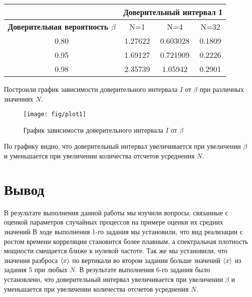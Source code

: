 \documentclass[a4paper,14pt]{extarticle}
\begin{document}
\begin{table}[htbp]
	\centering
	\begin{tabular}{|c|c|c|c|}
		\toprule
		\multicolumn{1}{|c|}{} & \multicolumn{3}{c|}{Доверительный интервал I} \\
		\midrule
		\textbf{Доверительная вероятность $\beta$} & N=1 & N=4 & N=32 \\
		\midrule
		0.80  & 1.27622 & 0.603028 & 0.1809 \\
		\midrule
		0.95  & 1.69127 & 0.721909 & 0.2226 \\
		\midrule
		0.98  & 2.35739 & 1.05942  & 0.2901 \\
		\bottomrule
	\end{tabular}%
\end{table}%
Построили график зависимости доверительного интервала $I$ от $\beta$ при различных значениях $N$.
 \begin{figure}[H]
	\centering
    \texttt{[image: fig/plot1]}
	\caption*{График зависимости доверительного интервала $I$ от $\beta$}
\end{figure}
По графику видно, что доверительный интервал увеличивается при увеличении $\beta$ и уменьшается при увеличении количества отсчетов усреднения $N$.
\section{Вывод}
В результате выполнения данной работы мы изучили вопросы, связанные с оценкой параметров случайных процессов на примере оценки их средних значений
В ходе выполнения 1-го задания мы установили, что вид реализации с ростом времени корреляции становится более плавным, а спектральная плотность мощности смещается ближе к нулевой частоте.
Так же мы установили, что значения разброса $\langle x\rangle$ по вертикали во втором задании больше значений $\langle x\rangle$ из задания 5 при любых $N$.
В результате выполнения 6-го задания было установлено, что доверительный интервал увеличивается при увеличении $\beta$ и уменьшается при увеличении количества отсчетов усреднения $N$.
\end{document}
